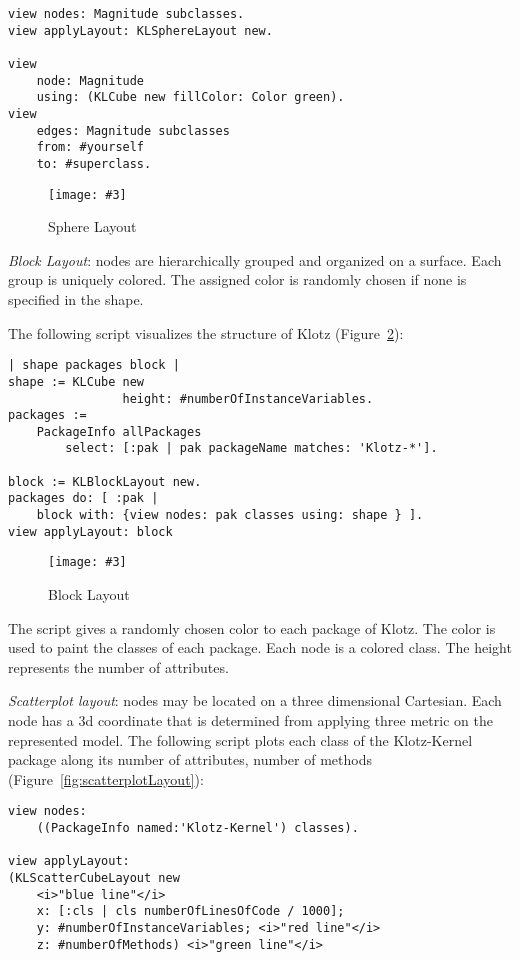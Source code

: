 \documentclass{sig-alternate}
\newcommand{\fig}[4]{
	\begin{figure}[#1]
		\centering
		\texttt{[image: \#3]}
		\caption{\label{fig:#3}#4}
	\end{figure}}
\newcommand{\figref}[1]{Figure~\ref{fig:#1}}
\begin{document}
\begin{lstlisting}
view nodes: Magnitude subclasses. 
view applyLayout: KLSphereLayout new. 

view 
	node: Magnitude 
	using: (KLCube new fillColor: Color green). 
view 
	edges: Magnitude subclasses 
	from: #yourself 
	to: #superclass.
\end{lstlisting}
\fig{}{0.4}{sphereLayout}{Sphere Layout}

\emph{Block Layout}: nodes are hierarchically grouped and organized on a surface. Each group is uniquely colored. The assigned color is randomly chosen if none is specified in the shape.


The following script visualizes the structure of Klotz (\figref{figure9.png}): 
\newpage
\begin{lstlisting}
| shape packages block |
shape := KLCube new 
				height: #numberOfInstanceVariables.
packages := 
	PackageInfo allPackages 
		select: [:pak | pak packageName matches: 'Klotz-*'].

block := KLBlockLayout new.
packages do: [ :pak | 
	block with: {view nodes: pak classes using: shape } ].
view applyLayout: block
	\end{lstlisting}
\fig{}{0.4}{figure9.png}{Block Layout}

The script gives a randomly chosen color to each package of Klotz. The color is used to paint the classes of each package. Each node is a colored class. The height represents the number of attributes. 

\emph{Scatterplot layout}: nodes may be located on a three dimensional Cartesian. Each node has a 3d coordinate that is determined from applying three metric on the represented model. The following script plots each class of the Klotz-Kernel package along its number of attributes, number of methods (\figref{scatterplotLayout}):

\begin{lstlisting}
view nodes: 
	((PackageInfo named:'Klotz-Kernel') classes).

view applyLayout: 
(KLScatterCubeLayout new
    <i>"blue line"</i>
    x: [:cls | cls numberOfLinesOfCode / 1000]; 
    y: #numberOfInstanceVariables; <i>"red line"</i>
    z: #numberOfMethods) <i>"green line"</i>
\end{lstlisting}
\end{document}
